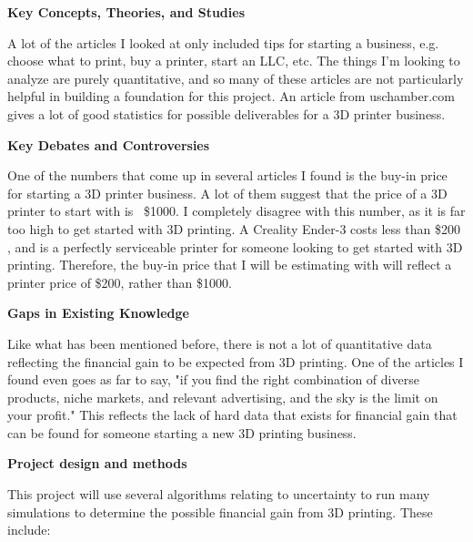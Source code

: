 \documentclass[11pt]{article}
\begin{document}
\bigbreak

\textbf{Key Concepts, Theories, and Studies}

A lot of the articles I looked at only included tips for starting a business, e.g. choose what to print, buy a printer, start an LLC, etc. The things
I'm looking to analyze are purely quantitative, and so many of these articles are not particularly helpful in building a foundation for this project.
An article from uschamber.com gives a lot of good statistics for possible deliverables for a 3D printer business.

\bigbreak

\textbf{Key Debates and Controversies}

One of the numbers that come up in several articles I found is the buy-in price for starting a 3D printer business. A lot of them suggest that the price of a
3D printer to start with is ~\$1000. \cite{raise3d} \cite{uschamber} I completely disagree with this number, as it is far too high to get started with 3D printing. A Creality Ender-3
costs less than \$200 \cite{creality}, and is a perfectly serviceable printer for someone looking to get started with 3D printing. Therefore, the buy-in price that I will
be estimating with will reflect a printer price of \$200, rather than \$1000.

\bigbreak

\textbf{Gaps in Existing Knowledge}

Like what has been mentioned before, there is not a lot of quantitative data reflecting the financial gain to be expected from 3D printing. One of the articles
I found even goes as far to say, "if you find the right combination of diverse products, niche markets, and relevant advertising, and the sky is the limit on your profit." \cite{startllc}
This reflects the lack of hard data that exists for financial gain that can be found for someone starting a new 3D printing business.

\bigbreak


\begin{center}
    \LARGE
    \textbf{Project design and methods}
\end{center}

This project will use several algorithms relating to uncertainty to run many simulations to determine the possible financial gain from 3D printing. These include:
\end{document}
